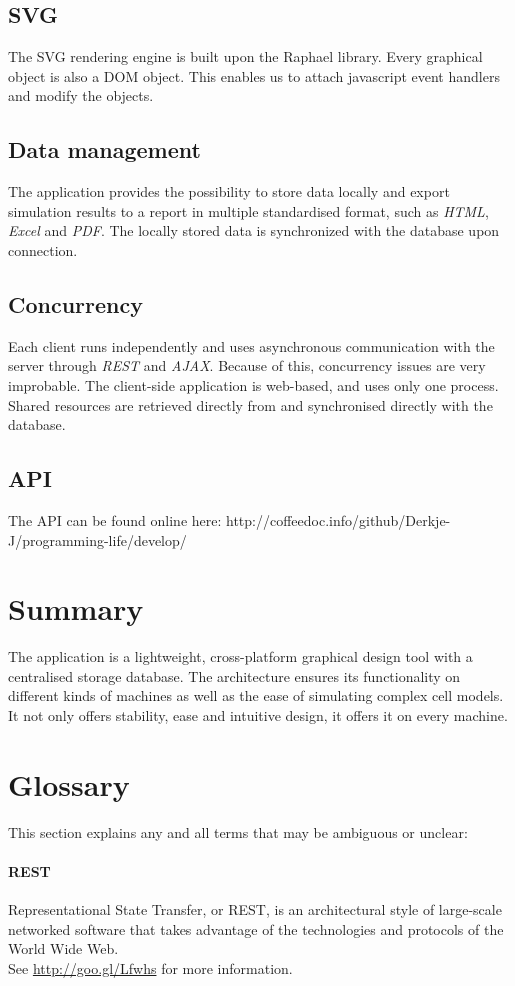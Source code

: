 \documentclass{report}
\begin{document}
		\subsection{SVG}
			The SVG rendering engine is built upon the Raphael library. Every graphical object is also a DOM object. This enables us to attach javascript event handlers and modify the objects.
		\subsection{Data management}
			The application provides the possibility to store data locally and export simulation results to a report in multiple standardised format, such as \emph{HTML}, \emph{Excel} and \emph{PDF}.
			The locally stored data is synchronized with the database upon connection. 
		\subsection{Concurrency}
			Each client runs independently and uses asynchronous communication with the server through \emph{REST} and \emph{AJAX}. Because of this, concurrency issues are very improbable. The client-side application is web-based, and uses only one process. Shared resources are retrieved directly from and synchronised directly with the database.
		\subsection{API}
			The API can be found online here: http://coffeedoc.info/github/Derkje-J/programming-life/develop/
	\clearpage
	\section{Summary}
		The application is a lightweight, cross-platform graphical design tool with a centralised storage database. The architecture ensures its functionality on different kinds of machines as well as the ease of simulating complex cell models. It not only offers stability, ease and intuitive design, it offers it on every machine.
	\section{Glossary}
		This section explains any and all terms that may be ambiguous or unclear:
		\paragraph{REST} 
			Representational State Transfer, or REST, is an architectural style of large-scale networked software that takes advantage of the technologies and protocols of the World Wide Web. \\
See \href{http://goo.gl/Lfwhs}{http://goo.gl/Lfwhs} for more information.
\end{document}
